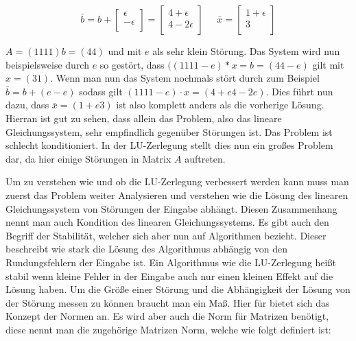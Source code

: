 \documentclass[course=erap]{aspdoc}
\begin{document}
\begin{equation}
\label{absBeis2}
\bar{b} = b + 
 \begin{bmatrix}
 \epsilon \\
 -\epsilon\\
 \end{bmatrix}
 = \begin{bmatrix}
 4 + \epsilon\\
 4- 2\epsilon\\
 \end{bmatrix}
  \;\;\;\;\;
  \bar{x} = 
  \begin{bmatrix}
 1 + \epsilon \\
 3\\
\end{bmatrix}
\end{equation}

 $A = (1 1 1 1) b = (4 4)$ und mit $e$ als sehr klein Störung. Das System wird                    %
nun beispielsweise durch $e$ so gestört, dass $((1 1 1 1-e)*x = b = (4 4-e)$ gilt mit$ x = (3 1)$. 
Wenn man nun das System nochmals stört durch zum Beispiel $\bar{b} = b + (e -e)$ sodass 
gilt $(1 1 1 1-e) \cdot x = (4+e 4-2e)$. Dies führt nun dazu, dass $\bar{x} = ( 1+e 3)$ ist also komplett 
anders als die vorherige Lösung.
Hierran ist gut zu sehen, dass allein das Problem, also 
das lineare Gleichungssystem, sehr empfindlich gegenüber Störungen ist.
Das Problem ist schlecht konditioniert. In der LU-Zerlegung stellt dies nun ein großes 
Problem dar, da hier einige Störungen in Matrix $A$ auftreten.

Um zu verstehen wie und ob die LU-Zerlegung verbessert werden kann muss man 
zuerst das Problem weiter Analysieren und verstehen wie die Lösung des linearen 
Gleichungssystem von Störungen der Eingabe abhängt. Diesen Zusammenhang nennt 
man auch Kondition des linearen Gleichungssystems. Es gibt auch den Begriff der 								%
Stabilität, welcher sich aber nun auf Algorithmen bezieht. Dieser beschreibt wie stark die 
Lösung des Algorithmus abhängig von den Rundungsfehlern der Eingabe ist. Ein Algorithmus wie die LU-Zerlegung heißt stabil wenn 
kleine Fehler in der Eingabe auch nur einen kleinen Effekt auf die Lösung haben.
Um die Größe einer Störung und die Abhängigkeit der Lösung von der Störung messen zu 
können braucht man ein Maß. Hier für bietet sich das Konzept der Normen an. Es wird aber 
auch die Norm für Matrizen benötigt, diese nennt man die zugehörige Matrizen Norm, 
welche wie folgt definiert ist: \\
\end{document}
